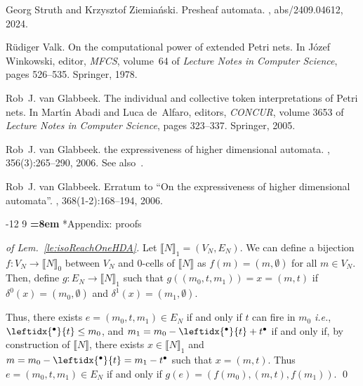 \documentclass[runningheads,envcountsame]{llncs}
\makeatletter
\newcommand*\ie{\textit{i.e.},}
\newcommand*\prepla[1]{\leftidx{^\bullet}{#1}}
\newcommand*\pospla[1]{#1^\bullet}
\newcommand*\sem[1]{\llbracket #1\rrbracket}
\renewcommand\section{\@startsection{section}{1}{\z@}%
  {-12\p@ \@plus -3\p@ \@minus -3\p@}%
  {9\p@ \@plus 3\p@ \@minus 3\p@}%
  {\normalfont\large\bfseries\boldmath
    \rightskip=\z@ \@plus 8em\pretolerance=10000 }}
\makeatother
\begin{document}
\begin{thebibliography}{10}
Georg Struth and Krzysztof Ziemia{\'n}ski.
\newblock Presheaf automata.
, abs/2409.04612, 2024.

R{\"{u}}diger Valk.
\newblock On the computational power of extended {Petri} nets.
\newblock In J{\'{o}}zef Winkowski, editor, {\em MFCS}, volume~64 of {\em
  {Lecture Notes in Computer Science}}, pages 526--535. {Springer}, 1978.

Rob~J. van Glabbeek.
\newblock The individual and collective token interpretations of {Petri} nets.
\newblock In Mart{\'{\i}}n Abadi and Luca de~Alfaro, editors, {\em CONCUR},
  volume 3653 of {\em {Lecture Notes in Computer Science}}, pages 323--337.
  {Springer}, 2005.

Rob~J. van Glabbeek.
\newblock {} the expressiveness of higher dimensional automata.
, 356(3):265--290, 2006.
\newblock See also~\cite{DBLP:journals/tcs/Glabbeek06a}.

Rob~J. van Glabbeek.
\newblock Erratum to ``{O}n the expressiveness of higher dimensional
  automata''.
, 368(1-2):168--194, 2006.

\end{thebibliography}

\appendix
\newpage

\section*{Appendix: proofs}

\begin{proof}[of Lem.~\ref{le:isoReachOneHDA}]
	Let $\sem{N}_1 = (V_N,E_N)$. We can define a bijection $f : V_N \to \sem{N}_0$ between $V_N$ and $0$-cells of $\sem{N}$ as  $f(m) = (m,\emptyset)$ for all $m \in V_N$.
	Then, define $g : E_N \to \sem{N}_1$ such that $g((m_0,t,m_1)) = x = (m,t)$ if $\delta^0(x) = (m_0,\emptyset)$ and $\delta^1(x) = (m_1,\emptyset)$.

	Thus, there exists $e = (m_0,t,m_1) \in E_N$ if and only if $t$ can fire in $m_0$ \ie $\prepla{t} \leq m_0$, and $m_1 = m_0-\prepla{t}+\pospla{t}$ if and only if, by construction of $\sem{N}$, there exists $x \in \sem{N}_1$ and $m= m_0 - \prepla{t} = m_1 - \pospla{t}$ such that $x =  (m,t)$.
    Thus $e = (m_0,t,m_1) \in E_N$ if and only if $g(e) =(f(m_0),(m,t),f(m_1))$.
        \qed
\end{proof}
\end{document}
